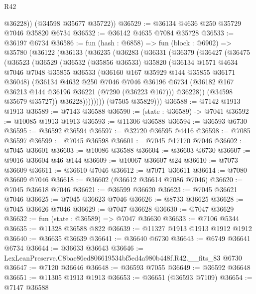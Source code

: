 \begin{lexlean}{R42}
\begin{coremodule}
{          @36228))
      (@34598 @35677 @35722))
@36529 := @36134 @4636 @250 @35729 @7046 @35820 @6734
@36532 := @36142 @4635 @7084 @35728
@36533 := @36197 @6734
@36586 := fun (hash : @6858) =>
  fun (block : @6902) =>
  @35780
    (@36122
      (@36133
        (@36235
          (@36283
            (@36331
              (@36379
                (@36427
                  (@36475
                    (@36523
                      (@36529
                        (@36532
                          (@35856 @36533)
                          @35820
                          (@36134
                            @1571
                            @4634
                            @7046
                            @7048
                            @35855
                            @36533
                            (@36160 @167 @35929 @144 @35855 @36171 @36048)
                            (@36134
                              @4632
                              @250
                              @7046
                              @7046
                              @36196
                              @6734
                              (@36182 @167 @36213 @144 @36196 @36221 (@7290 (@36223 @167)))
                              @36228))
                          (@34598 @35679 @35727))
                        @36228))))))))
        (@7505 @35829)))
@36588 := @7142 @1913 @1913
@36589 := @7143 @36588
@36590 := (state : @36589) -> @7041
@36592 := @10085 @1913 @1913
@36593 := @11306 @36588
@36594 := @36593 @6730
@36595 := @36592 @36594
@36597 := @32720 @36595 @4416
@36598 := @7085 @36597
@36599 := @7045 @36598
@36601 := @7045 @17170 @7046
@36602 := @7045 @36601
@36603 := @10086 @36588
@36604 := @36603 @6730
@36607 := @9016 @36604 @46 @144
@36609 := @10067 @36607 @24
@36610 := @7073 @36609
@36611 := @36610 @7046
@36612 := @7071 @36611
@36614 := @7080 @36609 @7046
@36618 := @36602 (@36612 @36614 @7086 @7046)
@36620 := @7045 @36618 @7046
@36621 := @36599 @36620
@36623 := @7045 @36621 @7046
@36625 := @7045 @36623 @7046
@36626 := @8733 @36625
@36628 := @7045 @36626 @7046
@36629 := @7047 @36628
@36630 := @7047 @36629
@36632 := fun (state : @36589) => @7047 @36630
@36633 := @7106 @5344
@36635 := @11328 @36588 @822
@36639 := @11327 @1913 @1913 @1912 @1912
@36640 := @36635 @36639
@36641 := @36640 @6730
@36643 := @6749 @36641 @6734
@36644 := @36633 @36643
@36646 := LexLeanPreserve.C8bae86ed806619534bf5ed4a980b448f.R42.__fits_83 @6730
@36647 := @7120 @36646
@36648 := @36593 @7055
@36649 := @36592 @36648
@36651 := @11305 @1913 @1913
@36653 := @36651 (@36593 @7109)
@36654 := @7147 @36588
}
\end{coremodule}
\end{lexlean}
